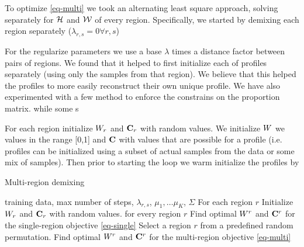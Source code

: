 

To optimize \eqref{eq-multi} we took an alternating least square approach, solving separately for ${\cal{H}}$ and ${\cal{W}}$ of every region. Specifically, we started by demixing each region separately ($\lambda_{r,s}=0 \forall r,s$)


For the regularize parameters we use a base $\lambda$ times a distance factor between pairs of regions.
We found that it helped to first initialize each of profiles separately (using only the samples from that region). We believe that this helped the profiles to more easily reconstruct their own unique profile.
We have also experimented with a few method to enforce the constrains on the proportion matrix. while some s

For each region initialize $W_r$ and $\mathbf{C}_r$ with random values. We initialize $W$ we values in the range [0,1] and $\mathbf{C}$ with values that are possible for a profile (i.e. profiles can be initialized using a subset of actual samples from the data or some mix of samples). Then prior to starting the loop we warm initialize the profiles by


\begin{algorithm}[tb]
   \caption{Multi-region demixing}
   \label{alg:multimix}
   \begin{algorithmic}[1]
    training data, max number of steps, $\lambda_{r,s}$, $\mu_1,\ldots\mu_K$, $\Sigma$
    For each region $r$
   \STATE \quad Initialize $W_r$ and $\mathbf{C}_r$ with random values.
    for every region $r$ 
   \STATE \quad Find optimal $W^r$ and $\mathbf{C}^r$ for the single-region objective \eqref{eq-single}
   \REPEAT
   \STATE Select a region $r$ from a predefined random permutation.
   \STATE Find optimal $W^r$ and $\mathbf{C}^r$ for the multi-region objective \eqref{eq-multi}
\end{algorithmic}
\end{algorithm}


